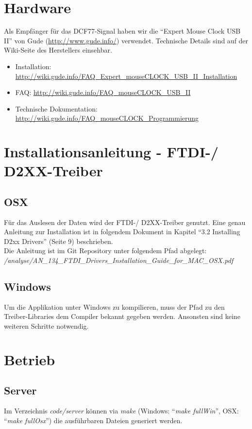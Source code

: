\section{Hardware}
Als Empfänger für das DCF77-Signal haben wir die  "`Expert Mouse Clock USB II"' von Gude (\url{http://www.gude.info/}) verwendet. Technische Details sind auf der Wiki-Seite des Herstellers einsehbar.
\begin{itemize}
\item Installation: \url{http://wiki.gude.info/FAQ_Expert_mouseCLOCK_USB_II_Installation} \\
\item FAQ: \url{http://wiki.gude.info/FAQ_mouseCLOCK_USB_II} \\
\item Technische Dokumentation: \url{http://wiki.gude.info/FAQ_mouseCLOCK_Programmierung} \\
\end{itemize}

\section{Installationsanleitung - FTDI-/ D2XX-Treiber}
\subsection{OSX}
Für das Auslesen der Daten wird der FTDI-/ D2XX-Treiber genutzt. Eine genau Anleitung zur Installation ist in folgendem Dokument in Kapitel "`3.2 Installing D2xx Drivers"' (Seite 9) beschrieben. \\

Die Anleitung ist im Git Repository unter folgendem Pfad abgelegt:\\
\textit{/analyse/AN\_134\_FTDI\_Drivers\_Installation\_Guide\_for\_MAC\_OSX.pdf}

\subsection{Windows}
Um die Applikation unter Windows zu kompilieren, muss der Pfad zu den Treiber-Libraries dem Compiler bekannt gegeben werden. Ansonsten sind keine weiteren Schritte notwendig.

\section{Betrieb}
\subsection{Server}
Im Verzeichnis \textit{code/server} können via \textit{make} (Windows: "`\textit{make fullWin}"', OSX: "`\textit{make fullOsx}"') die ausführbaren Dateien generiert werden.

